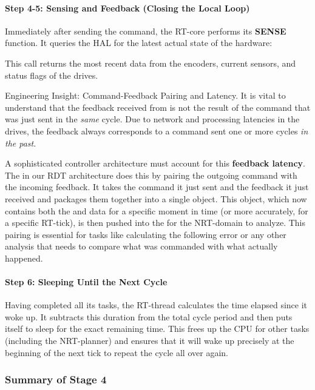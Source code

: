 \paragraph{Step 4-5: Sensing and Feedback (Closing the Local Loop)}
Immediately after sending the command, the RT-core performs its \textbf{SENSE} function. It queries the HAL for the latest actual state of the hardware:

This call returns the most recent data from the encoders, current sensors, and status flags of the drives.

\begin{tipbox}{Engineering Insight: Command-Feedback Pairing and Latency.}
    It is vital to understand that the feedback received from  is not the result of the command that was just sent in the \textit{same} cycle. Due to network and processing latencies in the drives, the feedback always corresponds to a command sent one or more cycles \textit{in the past}.
    
    A sophisticated controller architecture must account for this \textbf{feedback latency}. The  in our RDT architecture does this by pairing the outgoing command with the incoming feedback. It takes the command it just sent and the feedback it just received and packages them together into a single  object. This object, which now contains both the  and  data for a specific moment in time (or more accurately, for a specific RT-tick), is then pushed into the  for the NRT-domain to analyze. This pairing is essential for tasks like calculating the following error or any other analysis that needs to compare what was commanded with what actually happened.
\end{tipbox}

\paragraph{Step 6: Sleeping Until the Next Cycle}
Having completed all its tasks, the RT-thread calculates the time elapsed since it woke up. It subtracts this duration from the total cycle period and then puts itself to sleep for the exact remaining time. This frees up the CPU for other tasks (including the NRT-planner) and ensures that it will wake up precisely at the beginning of the next tick to repeat the cycle all over again.

\subsubsection{Summary of Stage 4}
\label{subsubsec:stage4_summary}


